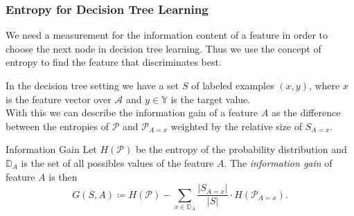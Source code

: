 \documentclass[english]{panikzettel}
\begin{document}
\subsubsection{Entropy for Decision Tree Learning}
\label{entropy_decision_trees}
We need a measurement for the information content of a feature in order to choose the next node in decision tree learning. Thus we use the concept of entropy to find the feature that discriminates best.

%

\begin{halfboxl}
\vspace{-\baselineskip}
    In the decision tree setting we have a set $S$ of labeled examples $(x,y)$, where $x$ is the feature vector over $\mathcal{A}$ and $y\in\mathbb{Y}$ is the target value. \\
	With this we can describe the information gain of a feature $A$ as the difference between the entropies of $\mathcal{P}$ and $\mathcal{P}_{A=x}$ weighted by the relative size of $S_{A=x}$.
\end{halfboxl}
\begin{halfboxr}
\vspace{-\baselineskip}
	\begin{defi}{Information Gain}
	Let $H(\mathcal{P})$ be the entropy of the probability distribution and $\mathbb{D}_A$ is the set of all possibles values of the feature $A$. The \emph{information gain} of feature $A$ is then
	\[
	G(S,A)\coloneqq H(\mathcal{P}) -\sum_{x\in\mathbb{D}_A}\frac{|S_{A=x}|}{|S|}\cdot H(\mathcal{P}_{A=x}).
	\]
	\end{defi}
\end{halfboxr}

\end{document}
